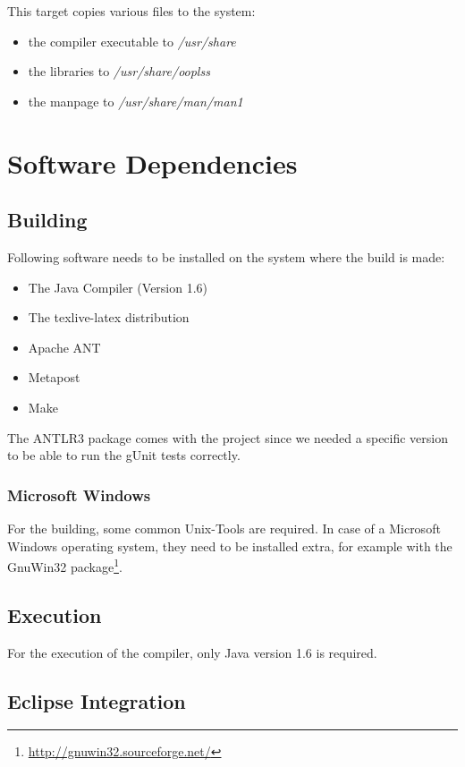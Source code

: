 This target copies various files to the system:
\begin{itemize}
\item the compiler executable to \emph{/usr/share}
\item the libraries to \emph{/usr/share/ooplss}
\item the manpage to \emph{/usr/share/man/man1}
\end{itemize}

\section{Software Dependencies}

\subsection{Building}
Following software needs to be installed on the system where the 
build is made:

\begin{itemize}
\item The Java Compiler (Version 1.6)
\item The texlive-latex distribution
\item Apache ANT
\item Metapost
\item Make
\end{itemize}

The ANTLR3 package comes with the project since we needed a specific version
to be able to run the gUnit tests correctly.


\subsubsection{Microsoft Windows}

For the building, some common Unix-Tools are required. In case of a 
Microsoft Windows operating system, they need to be installed extra, for
example with the GnuWin32 package\footnote{\href{http://gnuwin32.sourceforge.net/}{http://gnuwin32.sourceforge.net/}}.

\subsection{Execution}

For the execution of the compiler, only Java version 1.6 is required.

\subsection{Eclipse Integration}

